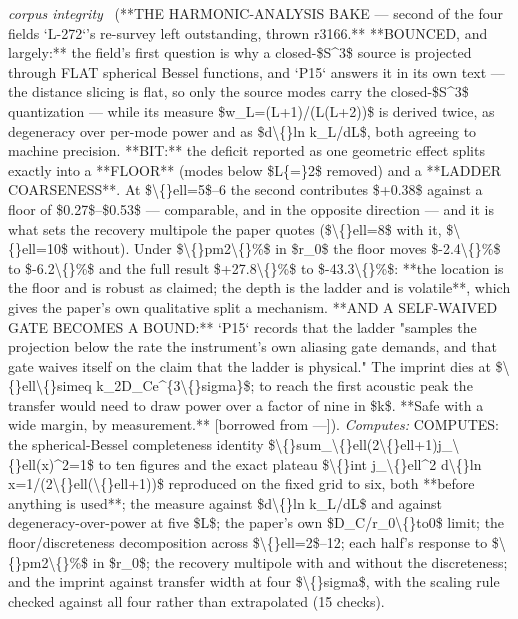 \begin{description}
\textit{corpus integrity} \ (**THE HARMONIC-ANALYSIS BAKE --- second of the four fields `L-272`'s re-survey left outstanding, thrown r3166.** **BOUNCED, and largely:** the field's first question is why a closed-\$S\textasciicircum{}3\$ source is projected through FLAT spherical Bessel functions, and `P15` answers it in its own text --- the distance slicing is flat, so only the source modes carry the closed-\$S\textasciicircum{}3\$ quantization --- while its measure \$w\_L=(L+1)/(L(L+2))\$ is derived twice, as degeneracy over per-mode power and as \$d\textbackslash\{\}ln k\_L/dL\$, both agreeing to machine precision. **BIT:** the deficit reported as one geometric effect splits exactly into a **FLOOR** (modes below \$L\{=\}2\$ removed) and a **LADDER COARSENESS**. At \$\textbackslash\{\}ell=5\$--6 the second contributes \$+0.38\$ against a floor of \$0.27\$--\$0.53\$ --- comparable, and in the opposite direction --- and it is what sets the recovery multipole the paper quotes (\$\textbackslash\{\}ell=8\$ with it, \$\textbackslash\{\}ell=10\$ without). Under \$\textbackslash\{\}pm2\textbackslash\{\}\%\$ in \$r\_0\$ the floor moves \$-2.4\textbackslash\{\}\%\$ to \$-6.2\textbackslash\{\}\%\$ and the full result \$+27.8\textbackslash\{\}\%\$ to \$-43.3\textbackslash\{\}\%\$: **the location is the floor and is robust as claimed; the depth is the ladder and is volatile**, which gives the paper's own qualitative split a mechanism. **AND A SELF-WAIVED GATE BECOMES A BOUND:** `P15` records that the ladder "samples the projection below the rate the instrument's own aliasing gate demands, and that gate waives itself on the claim that the ladder is physical." The imprint dies at \$\textbackslash\{\}ell\textbackslash\{\}simeq k\_2D\_Ce\textasciicircum{}\{3\textbackslash\{\}sigma\}\$; to reach the first acoustic peak the transfer would need to draw power over a factor of nine in \$k\$. **Safe with a wide margin, by measurement.** [borrowed from ---]). 
\emph{Computes:} COMPUTES: the spherical-Bessel completeness identity \$\textbackslash\{\}sum\_\textbackslash\{\}ell(2\textbackslash\{\}ell+1)j\_\textbackslash\{\}ell(x)\textasciicircum{}2=1\$ to ten figures and the exact plateau \$\textbackslash\{\}int j\_\textbackslash\{\}ell\textasciicircum{}2 d\textbackslash\{\}ln x=1/(2\textbackslash\{\}ell(\textbackslash\{\}ell+1))\$ reproduced on the fixed grid to six, both **before anything is used**; the measure against \$d\textbackslash\{\}ln k\_L/dL\$ and against degeneracy-over-power at five \$L\$; the paper's own \$D\_C/r\_0\textbackslash\{\}to0\$ limit; the floor/discreteness decomposition across \$\textbackslash\{\}ell=2\$--12; each half's response to \$\textbackslash\{\}pm2\textbackslash\{\}\%\$ in \$r\_0\$; the recovery multipole with and without the discreteness; and the imprint against transfer width at four \$\textbackslash\{\}sigma\$, with the scaling rule checked against all four rather than extrapolated (15 checks).

\end{description}
